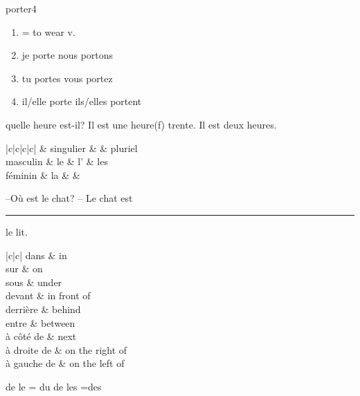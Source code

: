 \documentclass[./templates/main.tex]{subfiles}
\begin{document}
\begin{word}{porter}{}{4}\label{wo:porter}
  \begin{enumerate}[label=(\arabic*)]
    \item = to wear v.
    \item je porte nous portons
    \item tu portes vous portez
    \item il/elle porte ils/elles portent
  \end{enumerate}
\end{word}
\begin{grammar}
  quelle heure est-il?
  Il est une heure(f) trente.
  Il est deux heures.
\end{grammar}
\begin{grammar}
  \begin{tblr}{|c|c|c|c|}
    \hline
             &  singulier &                     & pluriel             \\
    \hline
    masculin & le                         &  l' & les \\
    \hline
    féminin  & la                         &                     &                     \\
    \hline
  \end{tblr}
\end{grammar}
\begin{grammar}
  --Où est le chat?
  -- Le chat est \rule{5em}{0.3mm} le lit.

  \begin{tblr}{|c|c|}
    dans        & in              \\
    sur         & on              \\
    sous        & under           \\
    devant      & in front of     \\
    derrière    & behind          \\
    entre       & between         \\
    à côté de   & next            \\
    à droite de & on the right of \\
    à gauche de & on the left of  \\

  \end{tblr}

  de le = du
  de les =des
\end{grammar}
\end{document}

